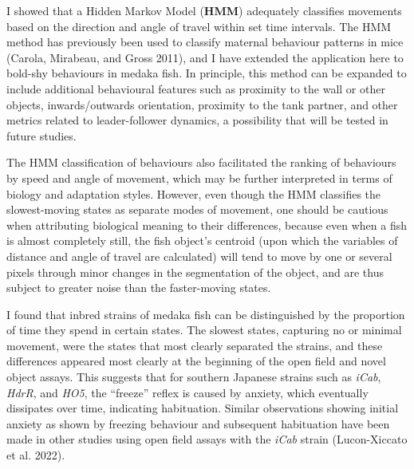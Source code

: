 \documentclass[
]{book}
\begin{document}
I showed that a Hidden Markov Model (\textbf{HMM}) adequately classifies movements based on the direction and angle of travel within set time intervals. The HMM method has previously been used to classify maternal behaviour patterns in mice (Carola, Mirabeau, and Gross 2011), and I have extended the application here to bold-shy behaviours in medaka fish. In principle, this method can be expanded to include additional behavioural features such as proximity to the wall or other objects, inwards/outwards orientation, proximity to the tank partner, and other metrics related to leader-follower dynamics, a possibility that will be tested in future studies.

The HMM classification of behaviours also facilitated the ranking of behaviours by speed and angle of movement, which may be further interpreted in terms of biology and adaptation styles. However, even though the HMM classifies the slowest-moving states as separate modes of movement, one should be cautious when attributing biological meaning to their differences, because even when a fish is almost completely still, the fish object's centroid (upon which the variables of distance and angle of travel are calculated) will tend to move by one or several pixels through minor changes in the segmentation of the object, and are thus subject to greater noise than the faster-moving states.

I found that inbred strains of medaka fish can be distinguished by the proportion of time they spend in certain states. The slowest states, capturing no or minimal movement, were the states that most clearly separated the strains, and these differences appeared most clearly at the beginning of the open field and novel object assays. This suggests that for southern Japanese strains such as \emph{iCab}, \emph{HdrR}, and \emph{HO5}, the ``freeze'' reflex is caused by anxiety, which eventually dissipates over time, indicating habituation. Similar observations showing initial anxiety as shown by freezing behaviour and subsequent habituation have been made in other studies using open field assays with the \emph{iCab} strain (Lucon-Xiccato et al. 2022).
\end{document}
